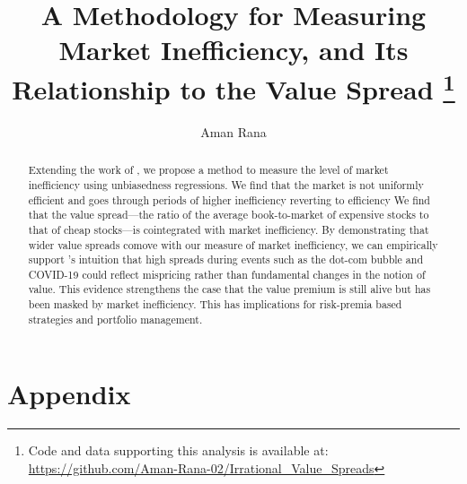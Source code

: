 \documentclass[11pt,a4paper,english]{article}
\date{\displaydate{date}}
\title{A Methodology for Measuring Market Inefficiency, and Its Relationship to the Value Spread 
\thanks{Code and data supporting this analysis is available at: \url{https://github.com/Aman-Rana-02/Irrational_Value_Spreads}}}
\author{%
  Aman Rana\\
}
\begin{document}
  \maketitle

  \begin{abstract}
    \noindent Extending the work of \citet{boguth_2023}, we propose a method to measure the level of market inefficiency using unbiasedness regressions.
    We find that the market is not uniformly efficient and goes through periods of higher inefficiency reverting to efficiency We find that the value spread—the ratio of the average book-to-market of expensive stocks to that of cheap stocks—is cointegrated with market inefficiency. 
    By demonstrating that wider value spreads comove with our measure of market inefficiency, we can empirically support \citet{asness_2024}'s intuition 
    that high spreads during events such as the dot-com bubble and COVID-19 could reflect mispricing rather than fundamental changes in the notion of value. 
    This evidence strengthens the case that the value premium is still alive but has been masked by market inefficiency. 
    This has implications for risk-premia based strategies and portfolio management.
  \end{abstract}

  \newpage
  \tableofcontents

  \newpage
  

  \newpage
  

  
  
  

  

  \newpage
  
  

  \section*{Appendix}
  \renewcommand{\thesection}{\Alph{section}}
  \setcounter{section}{0}
  
\end{document}
